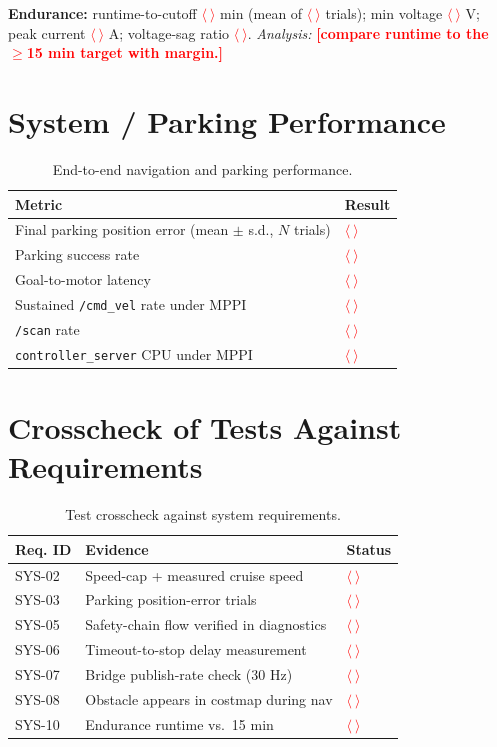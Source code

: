 \documentclass[12pt,a4paper]{report}
\newcommand{\TODO}[1]{\textcolor{red}{\textbf{[#1]}}}
\newcommand{\fillin}{\textcolor{red}{$\langle\ \rangle$}}
\begin{document}
\noindent\textbf{Endurance:} runtime-to-cutoff \fillin{} min (mean of \fillin{}
trials); min voltage \fillin{} V; peak current \fillin{} A; voltage-sag ratio
\fillin. \textit{Analysis:} \TODO{compare runtime to the $\geq$15 min target with
margin.}

\section{System / Parking Performance}

\begin{table}[H]
\centering
\caption{End-to-end navigation and parking performance.}
\label{tab:res_system}
\begin{tabularx}{\textwidth}{|X|p{3.6cm}|}
\hline
\textbf{Metric} & \textbf{Result} \\
\hline
Final parking position error (mean $\pm$ s.d., $N$ trials) & \fillin \\
\hline
Parking success rate & \fillin \\
\hline
Goal-to-motor latency & \fillin \\
\hline
Sustained \texttt{/cmd\_vel} rate under MPPI & \fillin \\
\hline
\texttt{/scan} rate & \fillin \\
\hline
\texttt{controller\_server} CPU under MPPI & \fillin \\
\hline
\end{tabularx}
\end{table}

\section{Crosscheck of Tests Against Requirements}

\begin{table}[H]
\centering
\caption{Test crosscheck against system requirements.}
\label{tab:test_crosscheck}
\begin{tabularx}{\textwidth}{|p{2.0cm}|X|p{2.2cm}|}
\hline
\textbf{Req. ID} & \textbf{Evidence} & \textbf{Status} \\
\hline
SYS-02 & Speed-cap + measured cruise speed & \fillin \\
\hline
SYS-03 & Parking position-error trials & \fillin \\
\hline
SYS-05 & Safety-chain flow verified in diagnostics & \fillin \\
\hline
SYS-06 & Timeout-to-stop delay measurement & \fillin \\
\hline
SYS-07 & Bridge publish-rate check (30 Hz) & \fillin \\
\hline
SYS-08 & Obstacle appears in costmap during nav & \fillin \\
\hline
SYS-10 & Endurance runtime vs.\ 15 min & \fillin \\
\hline
\end{tabularx}
\end{table}
\end{document}
